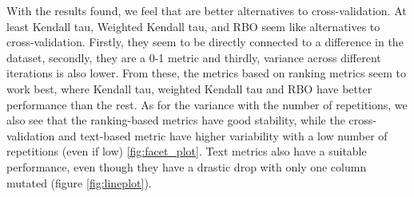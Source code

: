 With the results found, we feel that are better alternatives to cross-validation. At least  Kendall tau, Weighted Kendall tau, and RBO seem like alternatives to cross-validation.
Firstly, they seem to be directly connected to a difference in the dataset, secondly, they are a 0-1 metric and thirdly, variance across different iterations is also lower.
From these, the metrics based on ranking metrics seem to work best, where Kendall tau, weighted Kendall tau and RBO have better performance than the rest. As for the variance with the number of repetitions, we also see that the ranking-based metrics have good stability, while the cross-validation and text-based metric have higher variability with a low number of repetitions (even if low) \ref{fig:facet_plot}. 
Text metrics also have a suitable performance, even though they have a drastic drop with only one column mutated (figure \ref{fig:lineplot}).

